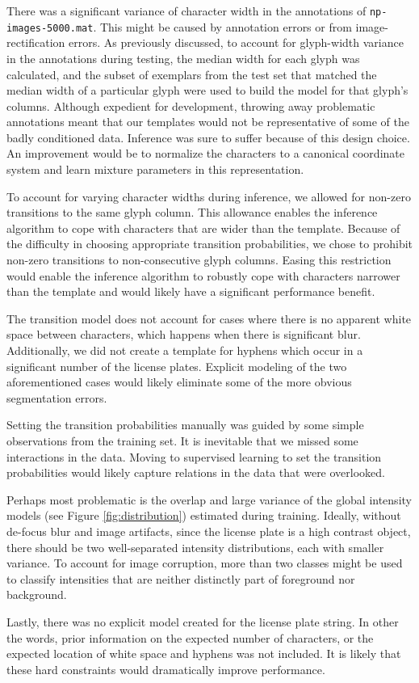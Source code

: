 \documentclass[a4paper,12pt]{article}
\begin{document}
There was a significant variance of character width in the annotations
of \texttt{np-images-5000.mat}. This might be caused by annotation
errors or from image-rectification errors. As previously discussed, to
account for glyph-width variance in the annotations during testing,
the median width for each glyph was calculated, and the subset of
exemplars from the test set that matched the median width of a
particular glyph were used to build the model for that glyph's
columns. Although expedient for development, throwing away problematic
annotations meant that our templates would not be representative of
some of the badly conditioned data. Inference was sure to suffer
because of this design choice. An improvement would be to normalize
the characters to a canonical coordinate system and learn mixture
parameters in this representation.

To account for varying character widths during inference, we allowed
for non-zero transitions to the same glyph column.  This allowance
enables the inference algorithm to cope with characters that are wider
than the template. Because of the difficulty in choosing appropriate
transition probabilities, we chose to prohibit non-zero transitions to
non-consecutive glyph columns. Easing this restriction would enable
the inference algorithm to robustly cope with characters narrower than
the template and would likely have a significant performance benefit.

The transition model does not account for cases where there is no
apparent white space between characters, which happens when there is
significant blur. Additionally, we did not create a template for
hyphens which occur in a significant number of the license
plates. Explicit modeling of the two aforementioned cases would likely
eliminate some of the more obvious segmentation errors.

Setting the transition probabilities manually was guided by some
simple observations from the training set. It is inevitable that we
missed some interactions in the data. Moving to supervised learning to
set the transition probabilities would likely capture relations in the
data that were overlooked.

Perhaps most problematic is the overlap and large variance of the
global intensity models (see Figure \ref{fig:distribution}) estimated
during training. Ideally, without de-focus blur and image artifacts,
since the license plate is a high contrast object, there should be two
well-separated intensity distributions, each with smaller variance. To
account for image corruption, more than two classes might be used to
classify intensities that are neither distinctly part of foreground
nor background.

Lastly, there was no explicit model created for the license plate
string. In other the words, prior information on the expected number
of characters, or the expected location of white space and hyphens was
not included. It is likely that these hard constraints would
dramatically improve performance. 
\end{document}
